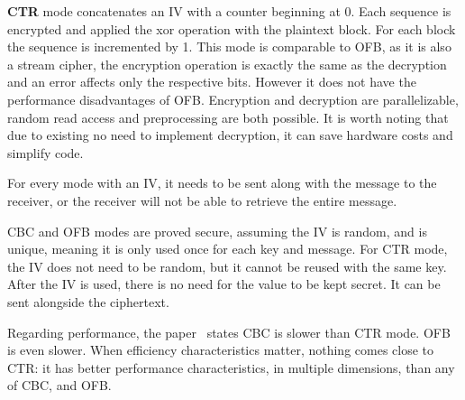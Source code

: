 %
\textbf{\ac{CTR}} mode concatenates an IV with a counter beginning at 0. Each sequence is encrypted and applied the xor operation with the plaintext block. For each block the sequence is incremented by 1.
This mode is comparable to \ac{OFB}, as it is also a stream cipher, the encryption operation is exactly the same as the decryption and an error affects only the respective bits.
However it does not have the performance disadvantages of \ac{OFB}. Encryption and decryption are parallelizable, random read access and preprocessing are both possible.
It is worth noting that due to existing no need to implement decryption, it can save hardware costs and simplify code.

For every mode with an \ac{IV}, it needs to be sent along with the message to the receiver, or the receiver will not be able to retrieve the entire message.

\ac{CBC} and \ac{OFB} modes are proved secure, assuming the \ac{IV} is random, and is unique, meaning it is only used once for each key and message. For \ac{CTR} mode, the IV does not need to be random, but it cannot be reused with the same key.
After the \ac{IV} is used, there is no need for the value to be kept secret. It can be sent alongside the ciphertext.

Regarding performance, the paper~\cite{aesmodes} states \ac{CBC} is slower than \ac{CTR} mode. \ac{OFB} is even slower.
When efficiency characteristics matter, nothing comes close to \ac{CTR}: it has better performance characteristics, in multiple dimensions, than any of \ac{CBC}, and \ac{OFB}.

